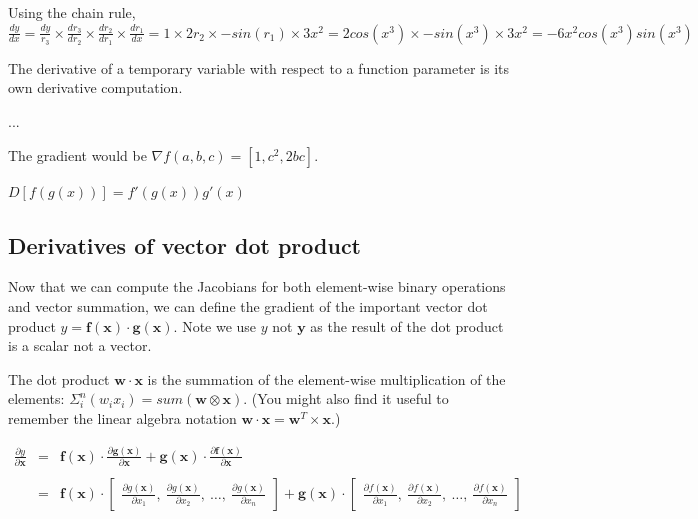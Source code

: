 \documentclass[11pt]{article}
\begin{document}
Using the chain rule, $\frac{dy}{dx} = \frac{dy}{r_3} \times \frac{dr_3}{d r_2} \times \frac{dr_2}{dr_1} \times \frac{dr_1}{dx} = 1 \times 2r_2 \times -sin(r_1) \times 3x^2 = 2cos(x^3) \times -sin(x^3) \times 3x^2 = -6x^2cos(x^3)sin(x^3)$

The derivative of a temporary variable with respect to a function parameter is its own  derivative computation. 

...

The gradient would be $\nabla f(a,b,c) = [1, c^2, 2bc]$.

$D[f(g(x))] = f'(g(x))g'(x)$

\subsection{Derivatives of vector dot product}

Now that we can compute the Jacobians for both element-wise binary operations and vector summation, we can define the gradient of the important vector dot product $y = \mathbf{f(x)} \cdot \mathbf{g(x)}$. Note we use $y$ not $\mathbf{y}$ as the result of the dot product is a scalar not a vector.

The dot product $\mathbf{w} \cdot \mathbf{x}$ is the summation of the element-wise multiplication of the elements: $\Sigma_i^n (w_i x_i) = sum(\mathbf{w} \otimes \mathbf{x})$. (You might also find it useful to remember the linear algebra notation $\mathbf{w} \cdot \mathbf{x} = \mathbf{w}^{T} \times \mathbf{x}$.)

$
\begin{array}{rcl}
\frac{\partial y}{\partial \mathbf{x}} & = & \mathbf{f(x)} \cdot \frac{\partial \mathbf{g(x)}}{\partial \mathbf{x}} + \mathbf{g(x)} \cdot \frac{\partial \mathbf{f(x)}}{\partial \mathbf{x}}\\\\
 & = & \mathbf{f(x)} \cdot \begin{bmatrix} \frac{\partial g(\mathbf{x})}{\partial x_1},~ \frac{\partial g(\mathbf{x})}{\partial x_2},~ \ldots,~ \frac{\partial g(\mathbf{x})}{\partial x_n} \end{bmatrix}  + \mathbf{g(x)} \cdot \begin{bmatrix} \frac{\partial f(\mathbf{x})}{\partial x_1},~ \frac{\partial f(\mathbf{x})}{\partial x_2},~ \ldots,~ \frac{\partial f(\mathbf{x})}{\partial x_n} \end{bmatrix}\\

\end{array}
$
\end{document}
